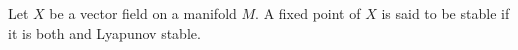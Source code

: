 \documentclass[12pt]{article}
\begin{document}
Let $X$ be a vector field on a manifold $M$. A fixed point of $X$ is said to be stable if it is both  and Lyapunov stable.
\end{document}
